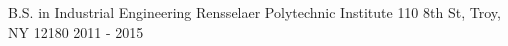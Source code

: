 

\begin{cventries}

  \cventry
    {B.S. in Industrial Engineering} %
    {Rensselaer Polytechnic Institute} %
    {110 8th St, Troy, NY 12180} %
    {2011 - 2015} %
    {
    }
\vspace{-0.7cm}
\end{cventries}
